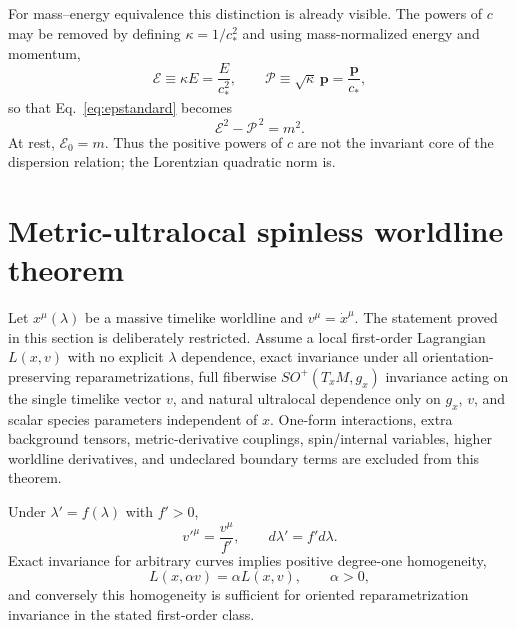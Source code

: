 \documentclass[11pt,a4paper]{article}
\begin{document}
For mass--energy equivalence this distinction is already visible.  The powers of $c$ may be removed by defining $\kappa=1/c_*^2$ and using mass-normalized energy and momentum,
\begin{equation}
\mathcal E\equiv \kappa E=\frac{E}{c_*^2},
\qquad
\bm{\mathcal P}\equiv \sqrt{\kappa}\,\bm p=\frac{\bm p}{c_*},
\end{equation}
so that Eq.~\eqref{eq:epstandard} becomes
\begin{equation}
\boxed{\mathcal E^2-\bm{\mathcal P}^{\,2}=m^2}.
\label{eq:massnormalizeddisp}
\end{equation}
At rest, $\mathcal E_0=m$.  Thus the positive powers of $c$ are not the invariant core of the dispersion relation; the Lorentzian quadratic norm is.


\section{Metric-ultralocal spinless worldline theorem}
\label{sec:worldline-theorem}
Let $x^\mu(\lambda)$ be a massive timelike worldline and $v^\mu=\dot x^\mu$.  The statement proved in this section is deliberately restricted.  Assume a local first-order Lagrangian $L(x,v)$ with no explicit $\lambda$ dependence, exact invariance under all orientation-preserving reparametrizations, full fiberwise $SO^+(T_xM,g_x)$ invariance acting on the single timelike vector $v$, and natural ultralocal dependence only on $g_x$, $v$, and scalar species parameters independent of $x$.  One-form interactions, extra background tensors, metric-derivative couplings, spin/internal variables, higher worldline derivatives, and undeclared boundary terms are excluded from this theorem.

Under $\lambda'=f(\lambda)$ with $f'>0$,
\begin{equation}
v'^{\mu}=\frac{v^\mu}{f'},\qquad d\lambda'=f' d\lambda.
\end{equation}
Exact invariance for arbitrary curves implies positive degree-one homogeneity,
\begin{equation}
L(x,\alpha v)=\alpha L(x,v),\qquad \alpha>0,
\label{eq:worldline-homogeneity}
\end{equation}
and conversely this homogeneity is sufficient for oriented reparametrization invariance in the stated first-order class.
\end{document}
